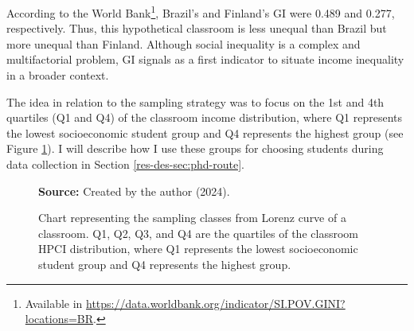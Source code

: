 According to the World Bank\footnote{Available in \url{https://data.worldbank.org/indicator/SI.POV.GINI?locations=BR}.}, Brazil's and Finland's \gls{GI} were 0.489 and 0.277, respectively. Thus, this hypothetical classroom is less unequal than Brazil but more unequal than Finland. Although social inequality is a complex and multifactorial problem, \gls{GI} signals as a first indicator to situate income inequality in a broader context.

The idea in relation to the sampling strategy was to focus on the 1st and 4th quartiles (\acrshort{Q}1 and \acrshort{Q}4) of the classroom income distribution, where \acrshort{Q}1 represents the lowest socioeconomic student group and \acrshort{Q}4 represents the highest group (see Figure \ref{fig:sampling-classes}). I will describe how I use these groups for choosing students during data collection in Section \ref{res-des-sec:phd-route}.

\begin{figure}[ht!]
\centering

\caption{\textmd{Chart representing the sampling classes from Lorenz curve of a classroom. \acrshort{Q}1, \acrshort{Q}2, \acrshort{Q}3, and \acrshort{Q}4 are the quartiles of the classroom HPCI distribution, where \acrshort{Q}1 represents the lowest socioeconomic student group and \acrshort{Q}4 represents the highest group.}}
\label{fig:sampling-classes}

\par\medskip\ABNTEXfontereduzida\selectfont\textbf{Source:} Created by the author (2024).
\end{figure}